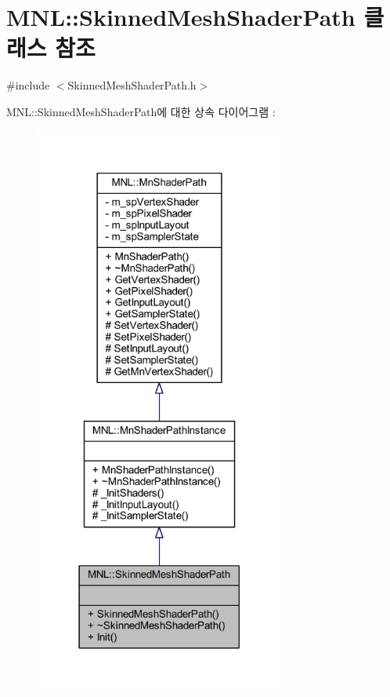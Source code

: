 \hypertarget{class_m_n_l_1_1_skinned_mesh_shader_path}{}\section{M\+NL\+:\+:Skinned\+Mesh\+Shader\+Path 클래스 참조}
\label{class_m_n_l_1_1_skinned_mesh_shader_path}


{\ttfamily \#include $<$Skinned\+Mesh\+Shader\+Path.\+h$>$}



M\+NL\+:\+:Skinned\+Mesh\+Shader\+Path에 대한 상속 다이어그램 \+: \nopagebreak
\begin{figure}[H]
\begin{center}
\leavevmode
\includegraphics[width=233pt]{class_m_n_l_1_1_skinned_mesh_shader_path__inherit__graph}
\end{center}
\end{figure}


